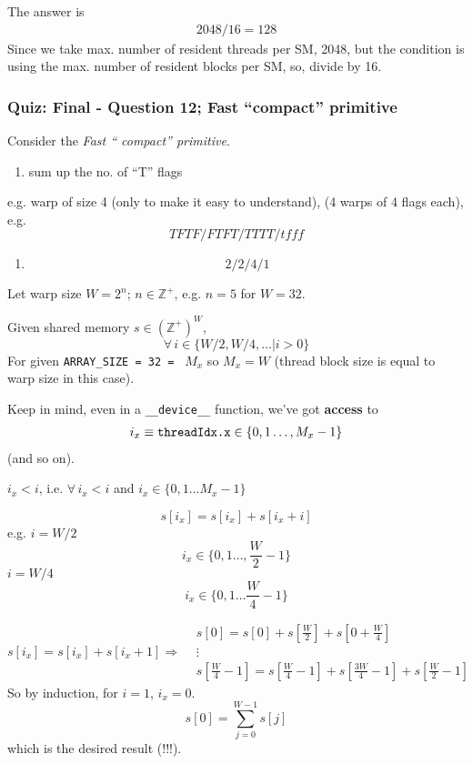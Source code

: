 \documentclass[10pt]{amsart}
\begin{document}
\begin{multicols*}{2}
The answer is
\begin{equation}
\begin{gathered}
\boxed{ 2048 / 16 = 128 }
  \end{gathered}
  \end{equation}
Since we take max. number of resident threads per SM, 2048, but the condition is using the max. number of resident blocks per SM, so, divide by 16.  

\subsubsection{Quiz: Final - Question 12; Fast ``compact'' primitive}

Consider the \emph{Fast `` compact'' primitive}.

\begin{enumerate}
\item sum up the no. of ``T'' flags
\end{enumerate}
e.g. warp of size 4 (only to make it easy to understand), (4 warps of 4 flags each), e.g.
\[
TFTF / FTFT / TTTT / tfff
\]

\begin{enumerate}
\item \[
2 / 2 / 4 / 1 
  \]
  \end{enumerate}

Let warp size $W=2^n$; $n\in \mathbb{Z}^+$, e.g. $n=5$ for $W=32$.

Given shared memory $s\in (\mathbb{Z}^+)^W$,
\[
\forall \, i \in \lbrace W/2, W/4 , \dots | i > 0 \rbrace
\]
For given \verb|ARRAY_SIZE = 32 = | $M_x$ so $M_x =W$ (thread block size is equal to warp size in this case).

Keep in mind, even in a \verb|__device__| function, we've got \textbf{access} to
\[
\begin{gathered}
  i_x \equiv \verb|threadIdx.x| \in \lbrace 0 , 1\dots, M_x - 1\rbrace
\end{gathered}
\]
(and so on).

$i_x < i$, i.e. $\forall \, i_x < i$ and $i_x \in \lbrace 0 , 1\dots M_x - 1\rbrace$

\[
s[i_x] = s[i_x] + s[i_x + i]
\]
e.g. $i=W/2$
\[
i_x \in \lbrace 0 ,1 \dots, \frac{W}{2} - 1\rbrace
\]
$i = W/4$
\[
i_x \in \lbrace 0,1 \dots \frac{W}{4} -1 \rbrace
\]

\[
s[i_x] = s[i_x] + s[i_x+1] \Longrightarrow \begin{aligned}
& s[0] = s[0] + s[\frac{W}{2} ] + s[0 + \frac{W}{4} ] \\ 
  & \vdots \\
  & s[\frac{W}{4} -1 ] = s[ \frac{W}{4}-1] + s[\frac{3W}{4} - 1] + s[\frac{W}{2} -1]
  \end{aligned}
\]
So by induction, for $i=1$, $i_x=0$.
\[
s[0] = \sum_{j=0}^{W-1} s[j]
\]
which is the desired result (!!!).


\end{multicols*}
\end{document}

